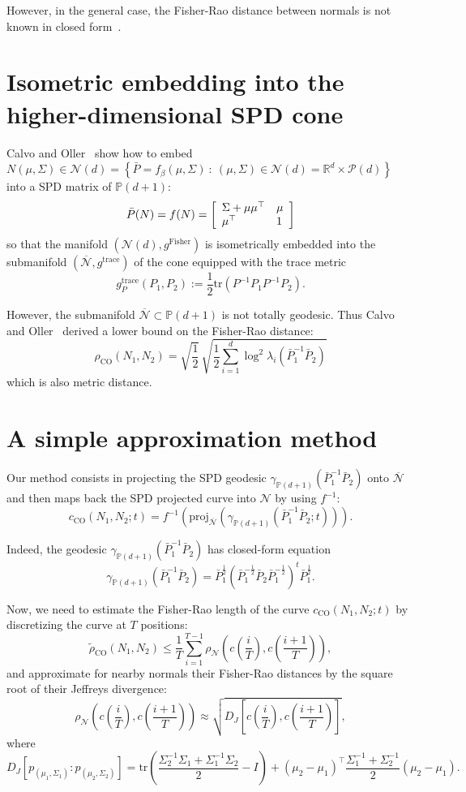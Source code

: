 \documentclass{article}
\def\bbP{\mathbb{P}}
\def\trace{\mathrm{trace}}
\def\proj{\mathrm{proj}}
\def\barN{{\overline{\mathcal{N}}}}
\def\CO{\mathrm{CO}}
\def\bbR{\mathbb{R}}
\def\Fisher{\mathrm{Fisher}}
\def\mattwotwo#1#2#3#4{{\left[\begin{array}{ll}#1 & #2\cr #3 & #4\end{array}\right]}}
\def\tr{\mathrm{tr}}
\def\calN{\mathcal{N}}
\def\calP{\mathcal{P}}
\def\barP{{\bar P}}
\def\st{\ :\ }
\def\bbR{\mathbb{R}}
\begin{document}
However, in the general case, the Fisher-Rao distance between normals is not known in closed form~\cite{FRMVNReview-2020}.

\section{Isometric embedding into the higher-dimensional SPD cone}

 
Calvo and Oller~\cite{SDPMVN-1990} show how to embed $N(\mu,\Sigma)\in\calN(d)= \left\{\barP=f_{\beta}(\mu,\Sigma) \st (\mu,\Sigma)\in \calN(d)=\bbR^d\times\calP(d)\right\}$ into a SPD matrix   of $\bbP(d+1)$:
$$
\barP(N)=f(N)=\mattwotwo{\Sigma+\mu\mu^\top}{\mu}{\mu^\top}{1}
$$ 
so that the manifold $(\calN(d),g^\Fisher)$ is isometrically embedded into the submanifold $(\barN,g^\trace)$ of the cone equipped with the trace metric
$$
g_P^\trace(P_1,P_2):= \frac{1}{2}\tr(P^{-1}P_1P^{-1}P_2).
$$
 
However, the submanifold $\barN\subset\bbP(d+1)$ is not totally geodesic.
Thus Calvo and Oller~\cite{SDPMVN-1990} derived a lower bound on the Fisher-Rao distance:
$$
\rho_\CO(N_1,N_2)=\sqrt{\frac{1}{2}}\, \sqrt{\frac{1}{2} \sum_{i=1}^d \log^2 \lambda_i(\barP_1^{-1}\barP_2)}
$$
which is also metric distance.


\section{A simple approximation method}

Our method consists in projecting the SPD geodesic $\gamma_{\bbP(d+1)}(\barP_1^{-1}\barP_2)$ onto $\barN$ and then maps back 
the SPD projected curve into $\calN$ by using $f^{-1}$: 
$$
c_\CO(N_1,N_2;t)=f^{-1}\left(\proj_{\barN}(\gamma_{\bbP(d+1)}(\barP_1^{-1}\barP_2;t))\right).
$$

Indeed, the geodesic $\gamma_{\bbP(d+1)}(\barP_1^{-1}\barP_2)$ has closed-form equation
$$
\gamma_{\bbP(d+1)}(\barP_1^{-1}\barP_2)=\barP_1^{\frac{1}{2}}\left(\barP_1^{-\frac{1}{2}}\barP_2\barP_1^{-\frac{1}{2}}\right)^t \barP_1^{\frac{1}{2}}.
$$

Now, we need to estimate the Fisher-Rao length of the curve $c_\CO(N_1,N_2;t)$ by discretizing the curve at $T$ positions:
$$
\tilde\rho_\CO(N_1,N_2)\leq \frac{1}{T} \sum_{i=1}^{T-1} \rho_\calN\left(c\left(\frac{i}{T}\right),c\left(\frac{i+1}{T}\right)\right), 
$$
and approximate for nearby normals their Fisher-Rao distances by the square root of their Jeffreys divergence:
$$
\rho_\calN\left(c\left(\frac{i}{T}\right),c\left(\frac{i+1}{T}\right)\right)\approx \sqrt{D_J\left[c\left(\frac{i}{T}\right),c\left(\frac{i+1}{T}\right)\right]},
$$
where
$$
D_J[p_{(\mu_1,\Sigma_1)}:p_{(\mu_2,\Sigma_2)}]=\tr\left(\frac{\Sigma_2^{-1}\Sigma_1+\Sigma_1^{-1}\Sigma_2}{2}-I\right)
+(\mu_2-\mu_1)^\top\frac{\Sigma_1^{-1}+\Sigma_2^{-1}}{2}(\mu_2-\mu_1).
$$
\end{document}
